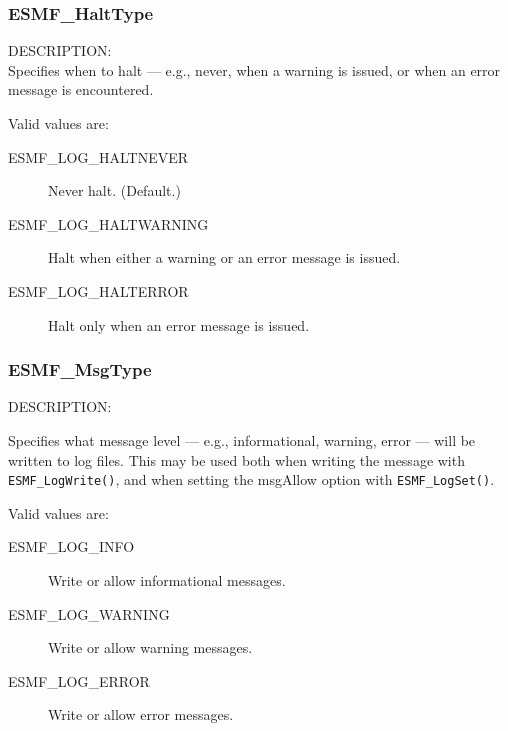 

\subsubsection{ESMF\_HaltType}

\label{opt:Halttype}
{\sf DESCRIPTION:\\}
Specifies when to halt --- e.g., never, when a warning is issued, or when an
error message is encountered.

Valid values are:
\begin{description}
   \item [ESMF\_LOG\_HALTNEVER] 
         Never halt.  (Default.)
   \item [ESMF\_LOG\_HALTWARNING]
         Halt when either a warning or an error message is issued.
   \item [ESMF\_LOG\_HALTERROR]
         Halt only when an error message is issued.
\end{description}

\subsubsection{ESMF\_MsgType}

\label{opt:msgtype}
{\sf DESCRIPTION:\\}
\begin{sloppypar}
Specifies what message level --- e.g., informational, warning, 
error --- will be written to log files.  This may be used both when
writing the message with {\tt ESMF\_LogWrite()}, and when setting the msgAllow
option with {\tt ESMF\_LogSet()}.
\end{sloppypar}

Valid values are:
\begin{description}
   \item [ESMF\_LOG\_INFO] 
         Write or allow informational messages.
   \item [ESMF\_LOG\_WARNING]
         Write or allow warning messages.
   \item [ESMF\_LOG\_ERROR]
         Write or allow error messages.
\end{description}


